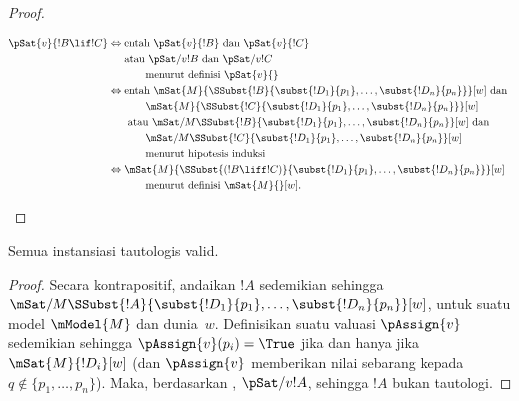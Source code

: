 \documentclass[../../../include/open-logic-section]{subfiles}
\begin{document}
\begin{proof}
\begin{enumerate}
{{\begin{align*}
        \pSat{v}{!B \lif !C} \Leftrightarrow {} &
        \text{entah } \pSat{v}{!B} \text{ dan } \pSat{v}{!C}\\
        & \text{atau } \pSat/{v}{!B} \text{ dan } \pSat/{v}{!C}\\
        &\qquad \text{menurut definisi $\pSat{v}{}$}\\
        \Leftrightarrow {} &
        \text{entah } \mSat{M}{\SSubst{!B}{\subst{!D_1}{p_1}, \dots,
            \subst{!D_n}{p_n}}}[w] \text{ dan }\\
        & \qquad \mSat{M}{\SSubst{!C}{\subst{!D_1}{p_1}, \dots,
          \subst{!D_n}{p_n}}}[w]\\ 
        &  \text{ atau } \mSat/{M}{\SSubst{!B}{\subst{!D_1}{p_1}, \dots,
            \subst{!D_n}{p_n}}}[w] \text{ dan }\\
        & \qquad \mSat/{M}{\SSubst{!C}{\subst{!D_1}{p_1}, \dots,
          \subst{!D_n}{p_n}}}[w]\\
        &\qquad\text{menurut hipotesis induksi}\\
        \Leftrightarrow {} &
        \mSat{M}{\SSubst{(!B \liff !C)}{\subst{!D_1}{p_1}, \dots,
          \subst{!D_n}{p_n}}}[w]\\
        &\qquad \text{menurut definisi $\mSat{M}{}[w]$}.
      \end{align*}}}{}
  \end{enumerate}
  \end{proof}

\begin{prop}
  Semua instansiasi tautologis valid.
\end{prop}

\begin{proof}
  Secara kontrapositif, andaikan $!A$ sedemikian sehingga
  $\mSat/{M}{\SSubst{!A}{\subst{!D_1}{p_1}, \dots,
  \subst{!D_n}{p_n}}}[w]$, untuk suatu model $\mModel{M}$ dan dunia~$w$.
  Definisikan suatu valuasi $\pAssign{v}$ sedemikian sehingga
  $\pAssign{v}(p_i) = \True$ jika dan hanya jika $\mSat{M}{!D_i}[w]$
  (dan $\pAssign{v}$ memberikan nilai sebarang kepada
  $q \notin \{p_1, \dots, p_n \}$). Maka, berdasarkan
  , $\pSat/{v}{!A}$, sehingga $!A$ bukan tautologi.
\end{proof}
\end{document}
